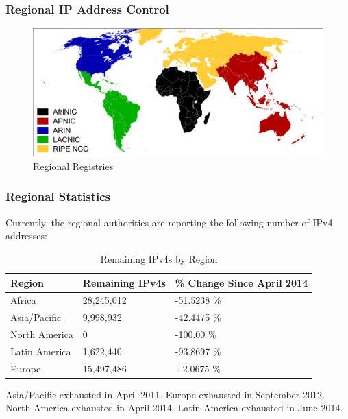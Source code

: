 \documentclass[aspectratio=169]{beamer}
\begin{document}
\begin{frame}
\frametitle{Regional IP Address Control}
\begin{figure}
\includegraphics[scale=0.44]{../artifacts/regional-registries.pdf}
\caption{Regional Registries}
\label{fig:regional}
\end{figure}
\end{frame}

\begin{frame}
\frametitle{Regional Statistics}
Currently, the regional authorities are reporting the following number of IPv4 addresses: \cite{he-stats}
\begin{table}
\begin{tabular}{|l|l|l|}
\hline
\textbf{Region} & \textbf{Remaining IPv4s} & \textbf{\% Change Since April 2014}\\
\hline
Africa & 28,245,012 & -51.5238 \%\\
\hline
Asia/Pacific & 9,998,932 & -42.4475 \%\\
\hline
North America & 0 & -100.00 \%\\
\hline
Latin America & 1,622,440 & -93.8697 \%\\
\hline
Europe & 15,497,486 & +2.0675 \%\\
\hline
\end{tabular}
\caption{Remaining IPv4s by Region}
\label{tbl:remaining}
\end{table}
Asia/Pacific exhausted in April 2011. Europe exhausted in September 2012. North America exhausted in April 2014. \cite{arin} Latin America exhausted in June 2014. \cite{lacnic}
\end{frame}
\end{document}
